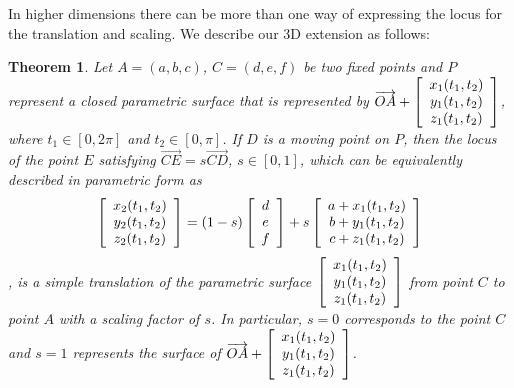 \documentclass[12pt,a4paper]{article}%
\newtheorem{theorem}{Theorem}
\begin{document}
In higher dimensions there can be more than one way of expressing the locus for the translation
and scaling. We describe our 3D extension as follows:

\begin{theorem}
Let $A=(a, b, c )$, $C=(d,e,f)$ be two fixed points and $P$ represent
a closed parametric surface that is represented by $\overrightarrow
{OA}+\left[
\begin{array}
[c]{c}%
x_{1}(t_{1},t_{2})\\
y_{1}(t_{1},t_{2})\\
z_{1}(t_{1},t_{2})
\end{array}
\right]$, where $t_{1}\in[0,2\pi]$ and $t_{2}\in[0,\pi]$. If $D$
is a moving point on $P$, then the locus of the point $E$ satisfying $\overrightarrow
{CE}=s\overrightarrow{CD}$, $s\in[0,1]$, which can be equivalently
described in parametric form as
\[
\left[
\begin{array}
[c]{c}%
x_{2}(t_{1},t_{2})\\
y_{2}(t_{1},t_{2})\\
z_{2}(t_{1},t_{2})
\end{array}
\right]  =(1-s)\left[
\begin{array}
[c]{c}%
d\\
e\\
f
\end{array}
\right]  +s\left[
\begin{array}
[c]{c}%
a+x_{1}(t_{1},t_{2})\\
b+y_{1}(t_{1},t_{2})\\
c+z_{1}(t_{1},t_{2})
\end{array}
\right]
\],
is a simple translation of the parametric surface $\left[
\begin{array}
[c]{c}%
x_{1}(t_{1},t_{2})\\
y_{1}(t_{1},t_{2})\\
z_{1}(t_{1},t_{2})
\end{array}
\right]$ from point $C$ to point $A$ with a scaling factor of $s$. In
particular, $s=0$ corresponds to the point $C$ and $s=1$ represents the
surface of $\overrightarrow{OA}+\left[
\begin{array}
[c]{c}%
x_{1}(t_{1},t_{2})\\
y_{1}(t_{1},t_{2})\\
z_{1}(t_{1},t_{2})
\end{array}
\right]$.
\end{theorem}
\end{document}
